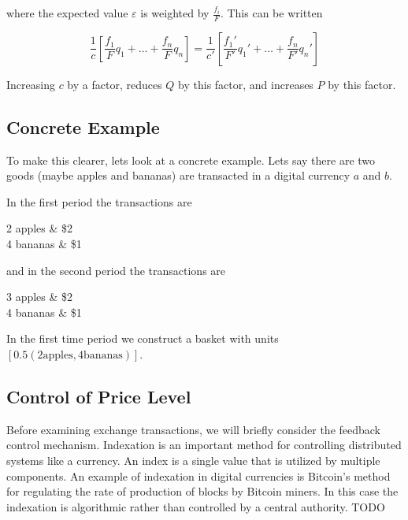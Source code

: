 where the expected value $\varepsilon$ is weighted by $\frac {f_i} F$. This can be written

\[
    \frac 1 c \left[ \frac {f_1} F q_1 + \dots + \frac {f_n} F q_n \right] =
    \frac 1 {c'} \left[ \frac {f_1'} {F'} q_1' + \dots + \frac {f_n} {F'} q_n' \right]
\]

Increasing $c$ by a factor, reduces $Q$ by this factor, and increases $P$ by this factor.

\subsection{Concrete Example}

To make this clearer, lets look at a concrete example. Lets say there are two goods (maybe apples
and bananas) are transacted in a digital currency $a$ and $b$.

In the first period the transactions are

    \begin{twocol}
        2 apples  & \$2 \\
        4 bananas & \$1 \\
    \end{twocol}

and in the second period the transactions are

    \begin{twocol}
        3 apples  & \$2 \\
        4 bananas & \$1 \\
    \end{twocol}

In the first time period we construct a basket with units $\left[ 0.5(2 \textrm{apples}, 4
\textrm{bananas}) \right]$.



\subsection{Control of Price Level}

Before examining exchange transactions, we will briefly consider the feedback control mechanism.
Indexation is an important method for controlling distributed systems like a currency. An index is a
single value that is utilized by multiple components. An example of indexation in digital currencies
is Bitcoin's method for regulating the rate of production of blocks by Bitcoin miners. In this case
the indexation is algorithmic rather than controlled by a central authority. TODO

